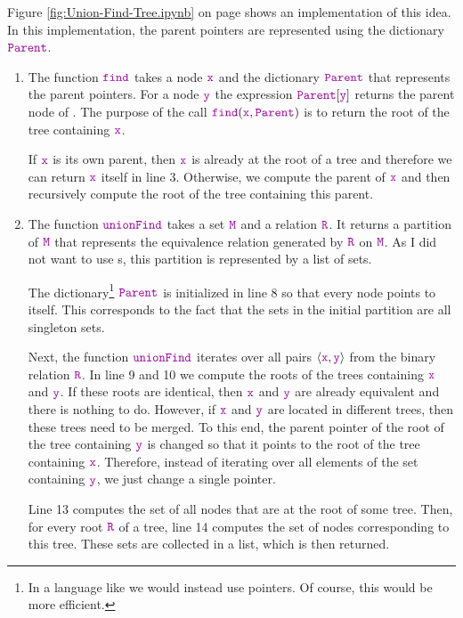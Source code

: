 Figure \ref{fig:Union-Find-Tree.ipynb} on page \pageref{fig:Union-Find-Tree.ipynb} shows an
implementation of this idea.  In this implementation, the parent pointers are represented using the
dictionary $\mytt{Parent}$.  
\begin{enumerate}
\item The function $\mytt{find}$ takes a node $\mytt{x}$ and the dictionary $\mytt{Parent}$ 
      that represents the parent pointers.  For a node $\mytt{y}$ the expression
      $\mytt{Parent}[\mytt{y}]$ returns the parent node of .
      The purpose of the call $\mytt{find}(\mytt{x}, \mytt{Parent})$ is to
      return the root of the tree containing $\mytt{x}$.

      If $\mytt{x}$ is its own parent, then $\mytt{x}$ is already at the root of a tree and therefore 
      we can return $\mytt{x}$ itself in line 3.
      Otherwise, we compute the parent of $\mytt{x}$ and then recursively compute the root of the tree
      containing this parent.  
\item The function $\mytt{unionFind}$ takes a set $\mytt{M}$ and a relation $\mytt{R}$.  It returns
      a partition of $\mytt{M}$ that represents the equivalence relation generated by $\mytt{R}$ on
      $\mytt{M}$.  As I did not want to use s, this partition is represented by a list of
      sets. 

      The dictionary\footnote{
        In a language like  we would instead use pointers.  Of course, this would be more efficient.
      } $\mytt{Parent}$ is initialized in line 8 so that every node
      points to itself.   This corresponds to the fact that the sets in the initial partition are all
      singleton sets.  

      Next, the function $\mytt{unionFind}$ iterates over all pairs $\langle\mytt{x}, \mytt{y}\rangle$ from the binary
      relation $\mytt{R}$.  In line 9 and 10 we compute the roots of the trees containing $\mytt{x}$ and
      $\mytt{y}$.  If these roots are identical, then $\mytt{x}$ and $\mytt{y}$ are already
      equivalent and there is nothing to do.  However, if $\mytt{x}$ and $\mytt{y}$ are located 
      in different trees, then these trees need to be merged.  To this end, the parent pointer of
      the root of the tree containing $\mytt{y}$ is changed so that it 
      points to the root of the tree containing $\mytt{x}$.  Therefore, instead of iterating over all
      elements of the set containing $\mytt{y}$, we just change a single pointer.

      Line 13 computes the set of all nodes that are at the root of some tree.  Then, for every root
      $\mytt{R}$ of a tree, line 14 computes the set of nodes corresponding to this tree.
      These sets are collected in a list, which is then returned.
\end{enumerate}

